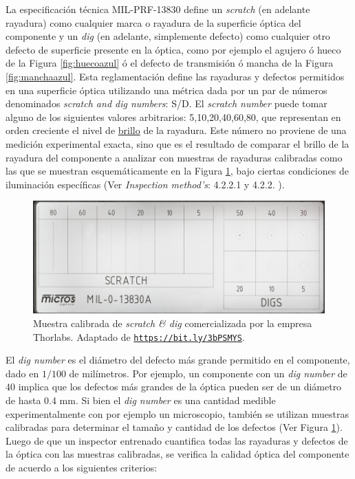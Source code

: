 \hspace{0.5cm}La especificación técnica MIL-PRF-13830 define un \textit{scratch} (en adelante rayadura) como cualquier marca o rayadura de la superficie óptica del componente y un \textit{dig} (en adelante, simplemente defecto) como cualquier otro defecto de superficie presente en la óptica, como por ejemplo el agujero ó hueco de la Figura \ref{fig:huecoazul} ó el defecto de transmisión ó mancha de la Figura \ref{fig:manchaazul}. Esta reglamentación define las rayaduras y defectos permitidos en una superficie óptica utilizando una métrica dada por un par de números denominados \textit{scratch and dig numbers}: S/D. El \textit{scratch number} puede tomar alguno de los siguientes valores arbitrarios: 5,10,20,40,60,80, que representan en orden creciente el nivel de \underline{brillo} de la rayadura. Este número no proviene de una medición experimental exacta, sino que es el resultado de comparar el brillo de la rayadura del componente a analizar con muestras de rayaduras calibradas como las que se muestran esquemáticamente en la Figura \ref{fig:scratchanddig}, bajo ciertas condiciones de iluminación específicas (Ver \textit{Inspection method's}: 4.2.2.1 y 4.2.2. \cite{milprf}).
\begin{figure}[H]
	\centering
	\includegraphics[scale=0.8]{Figs/cuantificaciondefectos/paddlecalibration.png}
	\caption{Muestra calibrada de \textit{scratch \& dig} comercializada por la empresa Thorlabs. Adaptado de \href{https://www.thorlabs.com/newgrouppage9.cfm?objectgroup_id=1427&pn=MOTP-MIL}{\texttt{https://bit.ly/3bPSMYS}}.}
	\label{fig:scratchanddig}
\end{figure}
El \textit{dig number} es el diámetro del defecto más grande permitido en el componente, dado en $1/100$ de milímetros. Por ejemplo, un componente con un \textit{dig number} de 40 implica que los defectos más grandes de la óptica pueden ser de un diámetro de hasta 0.4 mm. Si bien el \textit{dig number} es una cantidad medible experimentalmente con por ejemplo un microscopio, también se utilizan muestras calibradas para determinar el tamaño y cantidad de los defectos (Ver Figura \ref{fig:scratchanddig}). Luego de que un inspector entrenado cuantifica todas las rayaduras y defectos de la óptica con las muestras calibradas, se verifica la calidad óptica del componente de acuerdo a los siguientes criterios:
